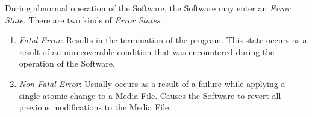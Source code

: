 \documentclass{designdoc}
\begin{document}
During abnormal operation of the Software, the Software may enter an
\textit{Error State}. There are two kinds of \textit{Error States}.
\begin{enumerate}
\item \textit{Fatal Error}: Results in the termination of the program. This
  state occurs as a result of an unrecoverable condition that was encountered
  during the operation of the Software.
\item \textit{Non-Fatal Error}: Usually occurs as a result of a failure while
  applying a single atomic change to a Media File. Causes the Software to
  revert all previous modifications to the Media File.
\end{enumerate}
\end{document}

